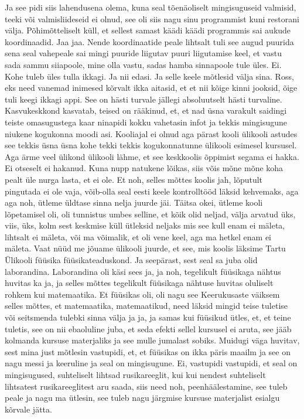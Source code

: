 Ja see pidi siis lahendusena olema, kuna seal tõenäoliselt mingisuguseid valmisid, teeki või valmisliideseid ei olnud, see oli siis nagu sinu programmist kuni restorani välja.
Põhimõtteliselt küll, et sellest samast käädi käädi programmis sai aukude koordinaadid. Jaa jaa. Nende koordinaatide peale lihtsalt tuli see augud puurida sena seal vahepeale sai mingi puuride liigutav puuri liigutamise keel, et vastu sada sammu siiapoole, mine olla vastu, sadas hamba sinnapoole tule üles. Ei. Kohe tuleb üles tulla ikkagi. Ja nii edasi.
Ja selle keele mõtlesid välja sina.
Ross, eks need vanemad inimesed kõrvalt ikka aitasid, et et nii kõige kinni jooksid, õige tuli keegi ikkagi appi.
See on hästi turvale jällegi absoluutselt hästi turvaline. Kasvukeskkond kasvatab, teised on rääkinud, et, et nad üsna varakult saidingi teiste omasugustega kaar ninapidi kokku vahetasin infot ja tekkis mingisugune niukene kogukonna moodi asi.
Kooliajal ei olnud aga pärast kooli ülikooli astudes see tekkis üsna üsna kohe tekki tekkis kogukonnatunne ülikooli esimesel kursusel.
Aga ärme veel ülikond ülikooli lähme, et see keskkoolis õppimist segama ei hakka.
Ei otseselt ei hakanud.
Kuna nupp natukene lõikas, siis võis mõne mõne koha pealt üle nurga lasta, et ei ole. Et noh, selles mõttes koolis jah, lõputult pingutada ei ole vaja, võib-olla seal eesti keele kontrolltööd läksid kehvemaks, aga aga noh, ütleme üldtase sinna nelja juurde jäi. Täitsa okei, ütleme kooli lõpetamisel oli, oli tunnistus umbes selline, et kõik olid neljad, välja arvatud üks, viis, üks, kolm sest keskmise küll ütleksid neljaks mis see kull enam ei mäleta, lihtsalt ei mäleta, või ma võimalik, et oli vene keel, aga ma hetkel enam ei mäleta.
Vaat nüüd me jõuame ülikooli juurde, et see, mis koolis läksime
Tartu Ülikooli füüsika füüsikateaduskond.
Ja seepärast, sest seal sa juba olid laborandina.
Laborandina oli käsi sees ja, ja noh, tegelikult füüsikaga nähtus huvitas ka ja, ja selles mõttes tegelikult füüsikaga nähtuse huvitas oluliselt rohkem kui matemaatika. Et füüsikas oli, oli nagu see
Keerukusaste väiksem selles mõttes, et matemaatika, matemaatikud, need läksid mingid teise tuletise või seitsmenda tulebki sinna välja ja ja, ja samas kui füüsikud ütles, et, et teine tuletis, see on nii ebaoluline juba, et seda efekti sellel kursusel ei aruta, see jääb kolmanda kursuse materjaliks ja see mulle jumalast sobiks.
Muidugi väga huvitav, sest mina just mõtlesin vastupidi, et, et füüsikas on ikka päris maailm ja see on nagu messi ja keeruline ja seal on mingisugune.
Ei, vastupidi vastupidi, et seal on mingisugused, suhteliselt lihtsad rusikareeglit, kui kui nendest suhteliselt lihtsatest rusikareeglitest aru saada, siis need noh, peenhäälestamine, see tuleb peale ja nagu ma ütlesin, see tuleb nagu järgmise kursuse materjalist esialgu kõrvale jätta.
